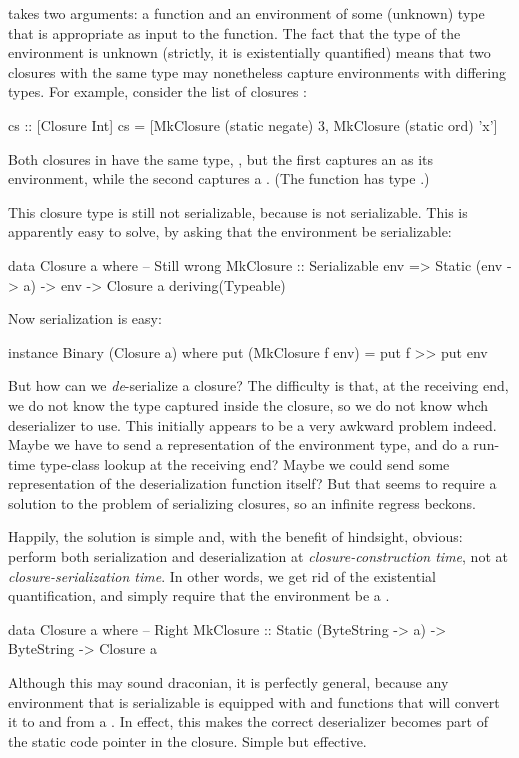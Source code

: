 \documentclass[preprint]{sigplanconf}
\begin{document}
 takes two arguments: a  function and an environment of some (unknown) type  that is appropriate as input to the function.
The fact that the type of the environment is unknown (strictly, it is existentially quantified) means 
that two closures with the same type may nonetheless capture environments
with differing types.  For example, consider the list of closures :
\begin{code}
  cs :: [Closure Int]
  cs = [MkClosure (static negate) 3,
        MkClosure (static ord)   'x']
\end{code}
Both closures in  have the same type, ,
but the first captures an  as its environment, while the second
captures a \mbox{.}  
(The function  has type .)

This closure type is still not serializable, because  is not serializable.
This is apparently easy to solve, by asking
that the environment be serializable:
\begin{code}
data Closure a where   -- Still wrong
  MkClosure :: Serializable env =>
        			Static (env -> a) -> env -> Closure a
  deriving(Typeable)
\end{code}
Now serialization is easy:
\begin{code}
instance Binary (Closure a) where
   put (MkClosure f env) = put f >> put env
\end{code}
But how can we \emph{de}-serialize a closure?  The difficulty is
that, at the receiving end, we do not know the type captured inside
the closure, so we do not know whch deserializer to use.  This initially
appears to be a very awkward problem indeed. Maybe we have to send a 
representation of the environment type, and do a run-time type-class lookup
at the receiving end?  Maybe
we could send some representation of the deserialization function itself?
But that seems to require a solution to the problem of serializing 
closures, so an infinite regress beckons.

Happily, the solution is simple and, with the benefit of hindsight,
obvious: perform both serialization and deserialization at \emph{closure-construction time},
not at \emph{closure-serialization time}.  
In other words, we get rid of the existential quantification, and simply require that the environment be a .  

\begin{code}
data Closure a where   -- Right
  MkClosure :: Static (ByteString -> a) ->
									ByteString -> Closure a
\end{code}
Although this may sound draconian, it is perfectly general, because any environment  that is serializable is equipped with  and  functions that will convert it to and from a . 
In effect, this makes the  correct deserializer becomes part of the static code pointer in the closure.  Simple but effective.
\end{document}
